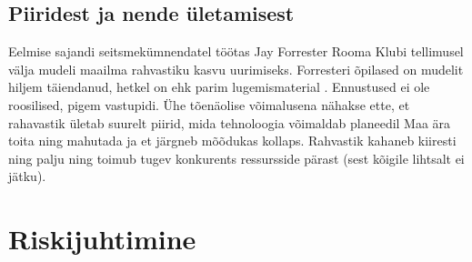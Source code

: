 \documentclass{article}
\begin{document}
\subsection{Piiridest ja nende ületamisest}
Eelmise sajandi seitsmekümnendatel töötas Jay Forrester Rooma Klubi tellimusel välja mudeli maailma rahvastiku kasvu uurimiseks. Forresteri õpilased on mudelit hiljem täiendanud, hetkel on ehk parim lugemismaterial \cite{meadows1992beyond}. Ennustused ei ole roosilised, pigem vastupidi. Ühe tõenäolise võimalusena nähakse ette, et rahavastik ületab suurelt piirid, mida tehnoloogia võimaldab planeedil Maa ära toita ning mahutada ja et järgneb mõõdukas kollaps. Rahvastik kahaneb kiiresti ning palju ning toimub tugev konkurents ressursside pärast (sest kõigile lihtsalt ei jätku). 

\section{Riskijuhtimine}
\end{document}
